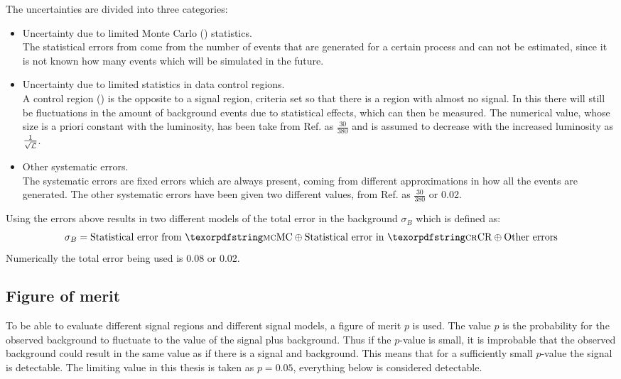 The uncertainties are divided into three categories:
\begin{itemize}
\item Uncertainty due to limited Monte Carlo (\abbrMC) statistics. \\
The statistical errors from \abbrMC come from the number of events that are generated for a certain process and can not be estimated, since it is not known how many events which will be simulated in the future.

\item Uncertainty due to limited statistics in data control regions.\\
A control region (\abbrCR) is the opposite to a signal region,  criteria set so that there is a region with almost no signal. In this \abbrCR there will still be fluctuations in the amount of background events due to statistical effects, which can then be measured. The numerical value, whose size is a priori constant with the luminosity, has been take from Ref. \citep{ATLAS-CONF-2012-147} as $\frac{30}{380}$ and is assumed to decrease with the increased luminosity as $\frac{1}{\sqrt{\mathcal{L}}}$.

\item Other systematic errors.\\
The systematic errors are fixed errors which are always present, coming from different approximations in how all the events are generated. The other systematic errors have been given two different values, from Ref. \citep{ATLAS-CONF-2012-147} as $\frac{30}{380}$ or 0.02.
\end{itemize}

Using the errors above results in two different models of the total error in the background $\sigma_B$ which is defined as:
\begin{equation*}
\sigma_B = \text{Statistical error from \abbrMC} \oplus \text{Statistical error in \abbrCR} \oplus \text{Other errors}
\end{equation*}
Numerically the total error being used is 0.08 or 0.02. 

\subsection{Figure of merit}\label{subsec:figmer}
To be able to evaluate different signal regions and different signal models, a figure of merit $p$ is used. The value $p$ is the probability for the observed background to fluctuate to the value of the signal plus background. Thus if the $p$-value is small, it is improbable that the observed background could result in the same value as if there is a signal and background. This means that for a sufficiently small $p$-value the signal is detectable. The limiting value in this thesis is taken as $p=0.05$, everything below is considered detectable. 

